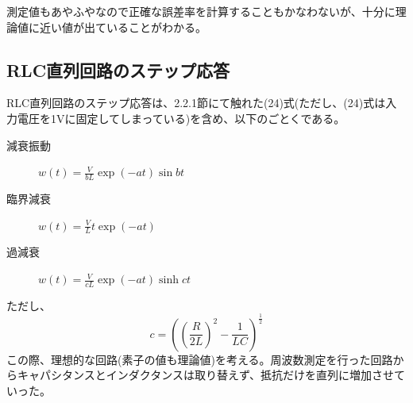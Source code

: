 \documentclass[10pt,a4j,dvipdfmx]{jsarticle}
\begin{document}
測定値もあやふやなので正確な誤差率を計算することもかなわないが、十分に理論値に近い値が出ていることがわかる。

\subsection{RLC直列回路のステップ応答}
RLC直列回路のステップ応答は、2.2.1節にて触れた(24)式(ただし、(24)式は入力電圧を1\si{\volt}に固定してしまっている)を含め、以下のごとくである。
\begin{description}
 \item[減衰振動] $w(t) = \frac{V}{bL} \exp(-at)\sin bt$
 \item[臨界減衰] $w(t) = \frac{V}{L} t\exp(-at)$
 \item[過減衰] $w(t) = \frac{V}{cL} \exp(-at)\sinh ct$
\end{description}
ただし、
\begin{equation}
c=\left(\left(\frac{R}{2L}\right)^2-\frac{1}{LC}\right)^{\frac{1}{2}}
\end{equation}
この際、理想的な回路(素子の値も理論値)を考える。周波数測定を行った回路からキャパシタンスとインダクタンスは取り替えず、抵抗だけを直列に増加させていった。
\end{document}
